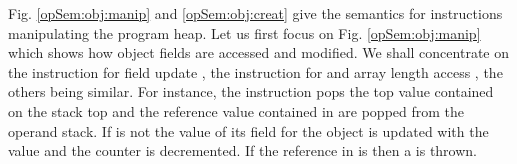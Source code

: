 \begin{figure}[ht!]
\end{figure}
\clearpage

Fig. \ref{opSem:obj:manip} and \ref{opSem:obj:creat}  give the semantics for instructions manipulating the program heap.
Let us first focus on Fig. \ref{opSem:obj:manip} which shows how object fields are accessed and modified. 
We shall concentrate on the instruction for field update \putfield{}, the instruction for  \arrstore{} and array length access \arraylength, the others being similar. 
For instance, the instruction \putfield{} pops the top value contained on the stack top \stackOnlyParam{\counterOnly} 
and the reference value contained in  
	are popped from the operand stack. If  is not \Mynull{} 
the value of its field 	\fieldd{} for the object  is updated with the value\stackOnlyParam{\counterOnly} and
 the counter \counterOnly{} is decremented. If the reference in  is \Mynull{} then a \NullPointerExc{} is thrown. 


